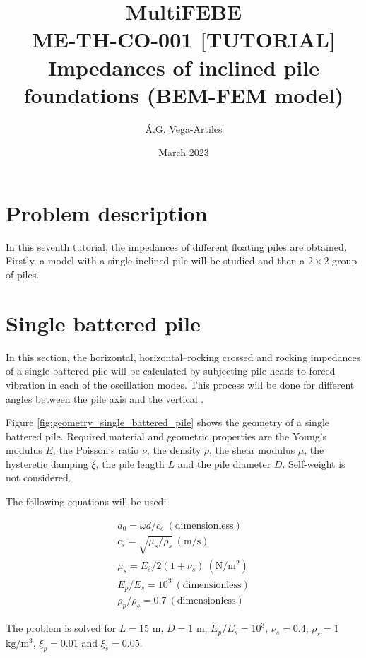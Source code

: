 \documentclass[a4]{article}
\title{MultiFEBE \\ ME-TH-CO-001 [TUTORIAL] \\ Impedances of inclined pile foundations (BEM-FEM model)}
\author{\'A.G. Vega-Artiles}
\date{March 2023}
\begin{document}
\maketitle

\tableofcontents 

\section{Problem description}

In this seventh tutorial, the impedances of different floating piles are obtained. Firstly, a model with a single inclined pile will be studied and then a $2 \times 2 $ group of piles. 
 
\section{Single battered pile}

In this section, the horizontal, horizontal–rocking crossed and rocking impedances of a single battered pile will be calculated by subjecting pile heads to forced vibration in each of the oscillation modes. This process will be done for different angles between the pile axis and the vertical \cite{padron}.

Figure \ref{fig:geometry_single_battered_pile} shows the geometry of a single battered pile. Required material and geometric properties are the Young's modulus $E$, the Poisson's ratio $\nu$, the density $\rho$, the shear modulus $\mu$, the hysteretic damping $\xi$, the pile length $L$ and the pile diameter $D$. Self-weight is not considered.

The following equations will be used: 

\begin{equation}
	\begin{array}{l}
		a_0 = \omega d/c_s \medspace \mathrm{(dimensionless)} \\
		c_s = \sqrt{\mu_s/\rho_s}\medspace \mathrm{(m/s)} \\
		\mu_s = E_s/2(1+\nu_s)\medspace \mathrm{(N/m^2)} \\
		E_p/E_s= 10^3 \medspace \mathrm{(dimensionless)} \\
		\rho_p/\rho_s=0.7 \medspace \mathrm{(dimensionless)}
	\end{array}
\end{equation}

The problem is solved for $L=15$ $\mathrm{m}$, $D=1$ $\mathrm{m}$, $E_p/E_s= 10^3$, $\nu_s=0.4$, $\rho_s=1$ $\mathrm{kg/m^3}$, $\xi_p=0.01$ and  $\xi_s=0.05$.
\end{document}
